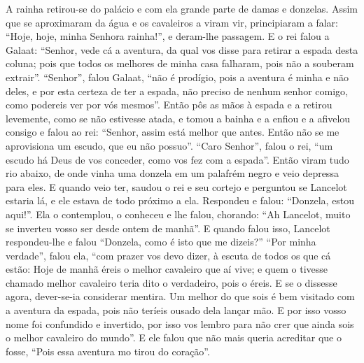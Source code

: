 A rainha retirou-se do palácio e com ela grande parte de damas e donzelas. Assim
que se aproximaram da água e os cavaleiros a viram vir, principiaram a falar:
“Hoje, hoje, minha Senhora rainha!”, e deram-lhe passagem. E o rei falou a
Galaat: “Senhor, vede cá a aventura, da qual vos disse para retirar a espada
desta coluna; pois que todos os melhores de minha casa falharam, pois não a
souberam extrair”. “Senhor”, falou Galaat, “não é prodígio, pois a aventura é
minha e não deles, e por esta certeza de ter a espada, não preciso de nenhum
senhor comigo, como podereis ver por vós mesmos”. Então pôs as mãos à
espada e a retirou levemente, como se não estivesse atada, e tomou a bainha e a
enfiou e a afivelou consigo e falou ao rei: “Senhor, assim está melhor que
antes. Então não se me aprovisiona um escudo, que eu não possuo”. “Caro
Senhor”, falou o rei, “um escudo há Deus de vos conceder, como vos fez com a
espada”. Então viram tudo rio abaixo, de onde vinha uma donzela em um palafrém
negro e veio depressa para eles. E quando veio ter, saudou o rei e seu cortejo
e perguntou se Lancelot estaria lá, e ele estava de todo próximo a ela.
Respondeu e falou: “Donzela, estou aqui!”. Ela o contemplou, o conheceu e lhe
falou, chorando: “Ah Lancelot, muito se inverteu vosso ser desde ontem de
manhã”. E quando falou isso, Lancelot respondeu-lhe e falou “Donzela, como é
isto que me dizeis?” “Por minha verdade”, falou ela, “com prazer vos devo
dizer, à escuta de todos os que cá estão: Hoje de manhã éreis o melhor
cavaleiro que aí vive; e quem o tivesse chamado melhor cavaleiro teria dito o
verdadeiro, pois o éreis. E se o dissesse agora, dever-se-ia considerar
mentira. Um melhor do que sois é bem visitado com a aventura da espada, pois
não teríeis ousado dela lançar mão. E por isso vosso nome foi confundido e
invertido, por isso vos lembro para não crer que ainda sois o melhor cavaleiro
do mundo”. E ele falou que não mais queria acreditar que o fosse, “Pois essa
aventura mo tirou do coração”. 

